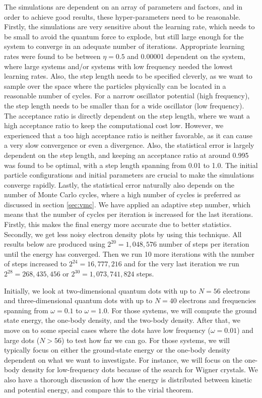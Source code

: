 The simulations are dependent on an array of parameters and factors, and in order to achieve good results, these hyper-parameters need to be reasonable. Firstly, the simulations are very sensitive about the learning rate, which needs to be small to avoid the quantum force to explode, but still large enough for the system to converge in an adequate number of iterations. Appropriate learning rates were found to be between $\eta=0.5$ and 0.00001 dependent on the system, where large systems and/or systems with low frequency needed the lowest learning rates. Also, the step length needs to be specified cleverly, as we want to sample over the space where the particles physically can be located in a reasonable number of cycles. For a narrow oscillator potential (high frequency), the step length needs to be smaller than for a wide oscillator (low frequency). The acceptance ratio is directly dependent on the step length, where we want a high acceptance ratio to keep the computational cost low. However, we experienced that a too high acceptance ratio is neither favorable, as it can cause a very slow convergence or even a divergence. Also, the statistical error is largely dependent on the step length, and keeping an acceptance ratio at around 0.995 was found to be optimal, with a step length spanning from 0.01 to 1.0. The initial particle configurations and initial parameters are crucial to make the simulations converge rapidly. Lastly, the statistical error naturally also depends on the number of Monte Carlo cycles, where a high number of cycles is preferred as discussed in section \ref{sec:vmc}. We have applied an adaptive step number, which means that the number of cycles per iteration is increased for the last iterations. Firstly, this makes the final energy more accurate due to better statistics. Secondly, we get less noisy electron density plots by using this technique. All results below are produced using $2^{20}=1,048,576$ number of steps per iteration until the energy has converged. Then we run 10 more iterations with the number of steps increased to $2^{24}=16,777,216$ and for the very last iteration we run $2^{28}=268,435,456$ or $2^{30}=1,073,741,824$ steps.

Initially, we look at two-dimensional quantum dots with up to $N=56$ electrons and three-dimensional quantum dots with up to $N=40$ electrons and frequencies spanning from  $\omega=0.1$ to $\omega=1.0$. For those systems, we will compute the ground state energy, the one-body density, and the two-body density. After that, we move on to some special cases where the dots have low frequency ($\omega=0.01$) and large dots ($N>56$) to test how far we can go. For those systems, we will typically focus on either the ground-state energy or the one-body density dependent on what we want to investigate. For instance, we will focus on the one-body density for low-frequency dots because of the search for Wigner crystals. We also have a thorough discussion of how the energy is distributed between kinetic and potential energy, and compare this to the virial theorem.

